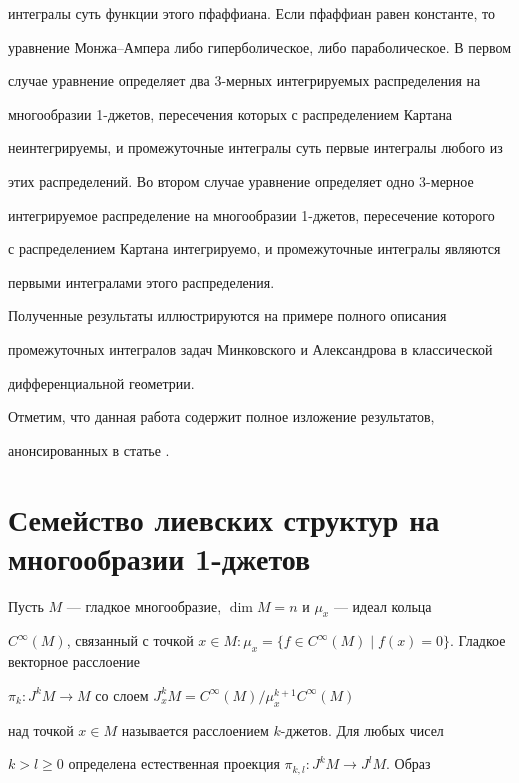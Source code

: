 интегралы суть функции этого пфаффиана. Если пфаффиан равен константе, то


уравнение Монжа--Ампера либо гиперболическое, либо параболическое. В первом


случае уравнение определяет два 3-мерных интегрируемых распределения на 


многообразии 1-джетов, пересечения которых с распределением Картана 


неинтегрируемы, и промежуточные интегралы суть первые интегралы любого из


этих распределений. Во втором случае уравнение определяет одно 3-мерное 


интегрируемое распределение на многообразии 1-джетов, пересечение которого 


с распределением Картана интегрируемо, и промежуточные интегралы являются 


первыми интегралами этого распределения. 


Полученные результаты иллюстрируются на примере полного описания 


промежуточных интегралов задач Минковского и Александрова в классической 


дифференциальной геометрии.





Отметим, что данная работа содержит полное изложение результатов, 


анонсированных в статье \cite{zilbergleit2}.





\section{Семейство лиевских структур на многообразии 1-джетов}





Пусть $M$ --- гладкое многообразие, $\dim M=n$ и $\mu_x$ --- идеал кольца


$C^\infty (M)$, связанный с точкой $x\in M: \mu_x=\{f\in


C^\infty (M)\mid f(x)=0\}$. Гладкое векторное расслоение 


$\pi_k:J^kM\to M$ со слоем $J_x^kM=C^\infty (M)/\mu_x^{k+1}C^\infty (M)$ 


над точкой $x\in M$ называется расслоением $k$-джетов. Для любых чисел 


$k>l\geq 0$ определена естественная проекция $\pi_{k,l}:J^kM\to J^lM$. Образ 


